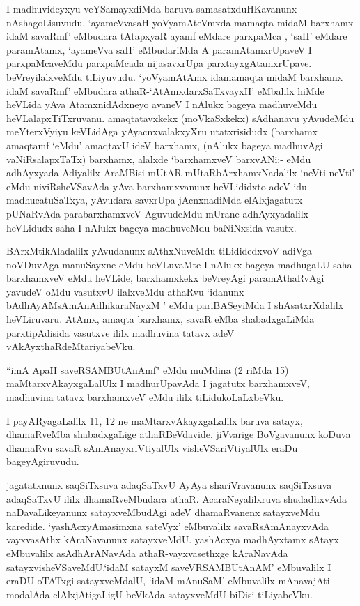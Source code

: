\begin{artha}
 I madhuvideyxyu veYSamayxdiMda baruva samasatxduHKavanunx nAshagoLisuvudu. `ayameVvasaH yoV\s yamAteVmxda mamaqta midaM barxhamx idaM savaRmf' eMbudara tAtapxyaR ayamf eMdare parxpaMca , `saH' eMdare paramAtamx, `ayameVva saH' eMbudariMda A paramAtamxrUpaveV I parxpaMcaveMdu parxpaMcada nijasavxrUpa parxtayxgAtamxrUpave. beVreyilalxveMdu tiLiyuvudu. `yoV\s yamAtAmx idamamaqta midaM barxhamx idaM savaRmf' eMbudara athaR-`AtAmxdarxSaTxvayxH' eMbalilx hiMde heVLida yAva AtamxnidAdxneyo avaneV I nAlukx bageya madhuveMdu heVLalapxTiTxruvanu. amaqtatavxkekx (moVkaSxkekx) sAdhanavu yAvudeMdu meYterxVyiyu keVLidAga yAyacnxvalakxyXru utatxrisidudx (barxhamx amaqtamf `eMdu' amaqtavU ideV barxhamx, (nAlukx bageya madhuvAgi vaNiRsalapxTaTx) barxhamx, alalxde `barxhamxveV barxvANi:- eMdu adhAyxyada Adiyalilx AraMBisi mUtAR mUtaRbArxhamxNadalilx `neVti neVti' eMdu niviRsheVSavAda yAva barxhamxvanunx heVLididxto adeV idu madhucatuSaTxya,  yAvudara savxrUpa jAcnxnadiMda elAlxjagatutx pUNaRvAda parabarxhamxveV AguvudeMdu mUrane adhAyxyadalilx heVLidudx saha I nAlukx bageya madhuveMdu baNiNxsida vasutx.
\end{artha}

\begin{artha}
BArxMtikAladalilx yAvudanunx sAthxNuveMdu tiLididedxvoV adiVga noVDuvAga manuSayxne eMdu 
heVLuvaMte I nAlukx bageya madhugaLU saha barxhamxveV eMdu heVLide, barxhamxkekx 
beVreyAgi paramAthaRvAgi yavudeV oMdu vasutxvU ilalxveMdu athaRvu `idanunx 
bAdhAyAMsAmAnAdhikaraNayxM ' eMdu pariBASeyiMda I shAsatxrXdalilx heVLiruvaru. AtAmx, 
amaqta barxhamx, savaR eMba shabadxgaLiMda parxtipAdisida vasutxve ililx madhuvina 
tatavx adeV vAkAyxthaRdeMtariyabeVku.

``imA ApaH saveRSAMBUtAnAmf" eMdu muMdina (2 riMda 15) maMtarxvAkayxgaLalUlx I madhurUpavAda I jagatutx barxhamxveV, madhuvina tatavx barxhamxveV eMdu ililx tiLidukoLaLxbeVku.
\end{artha}

\begin{artha}
I payARyagaLalilx 11, 12 ne maMtarxvAkayxgaLalilx baruva satayx, dhamaRveMba shabadxgaLige athaRBeVdavide. jiVvarige BoVgavanunx koDuva dhamaRvu savaR sAmAnayxriVtiyalUlx visheVSariVtiyalUlx eraDu bageyAgiruvudu.

jagatatxnunx saqSiTxsuva adaqSaTxvU AyAya shariVravanunx saqSiTxsuva adaqSaTxvU ililx dhamaRveMbudara  athaR. AcaraNeyalilxruva shudadhxvAda naDavaLikeyanunx satayxveMbudAgi adeV dhamaRvanenx satayxveMdu karedide. `yashAcxyAmasimxna sateVyx' eMbuvalilx savaRsAmAnayxvAda vayxvasAthx kAraNavanunx satayxveMdU. yashAcxya madhAyxtamx sAtayx eMbuvalilx asAdhArANavAda athaR-vayxvasethxge kAraNavAda satayxvisheVSaveMdU.`idaM satayxM saveVRSAMBUtAnAM' eMbuvalilx I eraDU oTATxgi satayxveMdalU, `idaM mAnuSaM' eMbuvalilx mAnavajAti modalAda elAlxjAtigaLigU beVkAda satayxveMdU biDisi tiLiyabeVku.
\end{artha}

